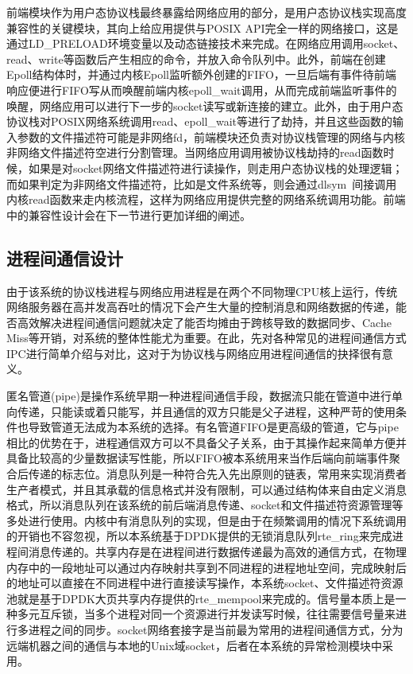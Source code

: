 前端模块作为用户态协议栈最终暴露给网络应用的部分，是用户态协议栈实现高度兼容性的关键模块，其向上给应用提供与POSIX API完全一样的网络接口，这是通过LD\_PRELOAD环境变量以及动态链接技术来完成。在网络应用调用socket、read、write等函数后产生相应的命令，并放入命令队列中。此外，前端在创建Epoll结构体时，并通过内核Epoll监听额外创建的FIFO，一旦后端有事件待前端响应便进行FIFO写从而唤醒前端内核epoll\_wait调用，从而完成前端监听事件的唤醒，网络应用可以进行下一步的socket读写或新连接的建立。此外，由于用户态协议栈对POSIX网络系统调用read、epoll\_wait等进行了劫持，并且这些函数的输入参数的文件描述符可能是非网络fd，前端模块还负责对协议栈管理的网络与内核非网络文件描述符空进行分割管理。当网络应用调用被协议栈劫持的read函数时候，如果是对socket网络文件描述符进行读操作，则走用户态协议栈的处理逻辑；而如果判定为非网络文件描述符，比如是文件系统等，则会通过dlsym~\cite{DLSYM}间接调用内核read函数来走内核流程，这样为网络应用提供完整的网络系统调用功能。前端中的兼容性设计会在下一节进行更加详细的阐述。

\subsection{进程间通信设计}
由于该系统的协议栈进程与网络应用进程是在两个不同物理CPU核上运行，传统网络服务器在高并发高吞吐的情况下会产生大量的控制消息和网络数据的传递，能否高效解决进程间通信问题就决定了能否均摊由于跨核导致的数据同步、Cache Miss等开销，对系统的整体性能尤为重要。在此，先对各种常见的进程间通信方式IPC进行简单介绍与对比，这对于为协议栈与网络应用进程间通信的抉择很有意义。

匿名管道(pipe)是操作系统早期一种进程间通信手段，数据流只能在管道中进行单向传递，只能读或着只能写，并且通信的双方只能是父子进程，这种严苛的使用条件也导致管道无法成为本系统的选择。有名管道FIFO是更高级的管道，它与pipe相比的优势在于，进程通信双方可以不具备父子关系，由于其操作起来简单方便并具备比较高的少量数据读写性能，所以FIFO被本系统用来当作后端向前端事件聚合后传递的标志位。消息队列是一种符合先入先出原则的链表，常用来实现消费者生产者模式，并且其承载的信息格式并没有限制，可以通过结构体来自由定义消息格式，所以消息队列在该系统的前后端消息传递、socket和文件描述符资源管理等多处进行使用。内核中有消息队列的实现，但是由于在频繁调用的情况下系统调用的开销也不容忽视，所以本系统基于DPDK提供的无锁消息队列rte\_ring来完成进程间消息传递的。共享内存是在进程间进行数据传递最为高效的通信方式，在物理内存中的一段地址可以通过内存映射共享到不同进程的进程地址空间，完成映射后的地址可以直接在不同进程中进行直接读写操作，本系统socket、文件描述符资源池就是基于DPDK大页共享内存提供的rte\_mempool来完成的。信号量本质上是一种多元互斥锁，当多个进程对同一个资源进行并发读写时候，往往需要信号量来进行多进程之间的同步。socket网络套接字是当前最为常用的进程间通信方式，分为远端机器之间的通信与本地的Unix域socket，后者在本系统的异常检测模块中采用。

